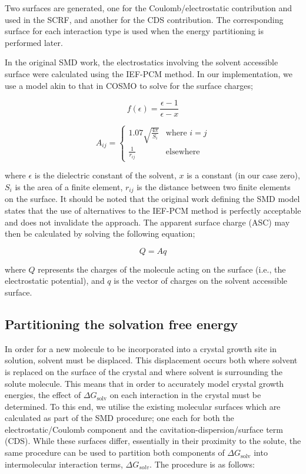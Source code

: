 \documentclass[twoside,twocolumn,9pt]{article}
\begin{document}
Two surfaces are generated, one for the Coulomb/electrostatic contribution and used in the SCRF, and another for the CDS contribution. The corresponding surface for each interaction type is used when the energy partitioning is performed later. 

In the original SMD work, the electrostatics involving the solvent accessible surface were calculated using the IEF-PCM\cite{Cances1997,Mennucci1997a,Mennucci1997b} method. In our implementation, we use a model akin to that in COSMO\cite{Klamt1993} to solve for the surface charges;

\begin{equation}
f(\epsilon) = \frac{\epsilon - 1}{\epsilon - x}
\end{equation}

\begin{equation}
    A_{ij} = 
    \begin{cases}
        1.07 \sqrt{\frac{4 \pi}{S_{i}}} & \text{where } i = j\\
        \frac{1}{r_{ij}} & \text{elsewhere }
    \end{cases}
\end{equation}

where $\epsilon$ is the dielectric constant of the solvent, $x$ is a constant (in our case zero), $S_i$ is the area of a finite element, $r_{ij}$ is the distance between two finite elements on the surface. It should be noted that the original work defining the SMD model states that the use of alternatives to the IEF-PCM method is perfectly acceptable and does not invalidate the approach. The apparent surface charge (ASC) may then be calculated by solving the following equation;

\begin{equation}
    Q = A q
\end{equation}

where $Q$ represents the charges of the molecule acting on the surface (i.e., the electrostatic potential), and $q$ is the vector of charges on the solvent accessible surface.

\subsection{Partitioning the solvation free energy}
In order for a new molecule to be incorporated into a crystal growth site in solution, solvent must be displaced. This displacement occurs both where solvent is replaced on the surface of the crystal and where solvent is surrounding the solute molecule. This means that in order to accurately model crystal growth energies, the effect of $\Delta G_{\textrm{solv}}$ on each interaction in the crystal must be determined. To this end, we utilise the existing molecular surfaces which are calculated as part of the SMD procedure; one each for both the electrostatic/Coulomb component and the cavitation-dispersion/surface term (CDS). While these surfaces differ, essentially in their proximity to the solute, the same procedure can be used to partition both components of
$\Delta G_{\textrm{solv}}$ into intermolecular interaction terms, $\Delta G_{solv}$. The procedure is as follows:
\end{document}
